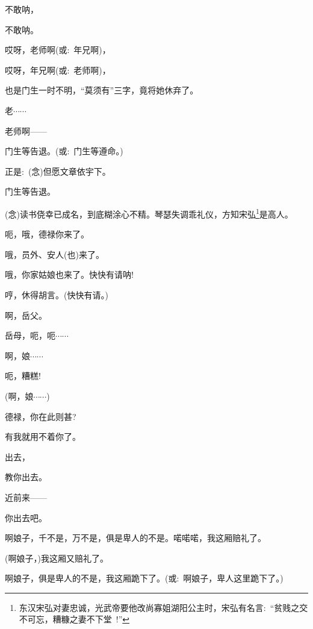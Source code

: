 {{不敢呐，}

{不敢呐。}

{哎呀，老师啊({\akai 或}:~年兄啊)，}

{哎呀，年兄啊({\akai 或}:~老师啊)，}

{也是门生一时不明，``莫须有''三字，竟将她休弃了。}

{老$\cdots{}\cdots{}$}

{老师啊------}


{门生等告退。({\akai 或}:~门生等遵命。)}

{正是:~({\akai 念})但愿文章依宇下。}

{门生等告退。}

\vspace{5pt}


{({\akai 念})读书侥幸已成名，到底糊涂心不精。琴瑟失调乖礼仪，方知宋弘\footnote{东汉宋弘对妻忠诚，光武帝要他改尚寡姐湖阳公主时，宋弘有名言:~``贫贱之交不可忘，糟糠之妻不下堂~!''}是高人。}

{呃，哦，德禄你来了。}

{哦，员外、安人(也)来了。}

{哦，你家姑娘也来了。快快有请呐!}

{哼，休得胡言。(快快有请。)}

{啊，岳父。}

{岳母，呃，呃$\cdots{}\cdots{}$}

{啊，娘$\cdots{}\cdots{}$}

{呃，糟糕!}

{(啊，娘$\cdots{}\cdots{}$)}

{德禄，你在此则甚?}

{有我就用不着你了。}

{出去，}

{教你出去。}

{近前来------}

{你出去吧。}

{啊娘子，千不是，万不是，俱是卑人的不是。喏喏喏，我这厢赔礼了。}

{(啊娘子，)我这厢又赔礼了。}

{啊娘子，俱是卑人的不是，我这厢跪下了。({\akai 或}:~啊娘子，卑人这里跪下了。)}

}
